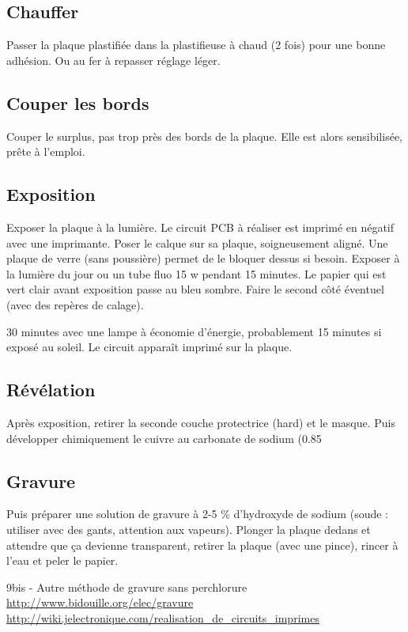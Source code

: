 \subsection{Chauffer}
Passer la plaque plastifiée dans la plastifieuse à chaud (2 fois) pour une bonne adhésion. Ou au fer à repasser réglage léger.

\subsection{Couper les bords}
Couper le surplus, pas trop près des bords de la plaque.
Elle est alors sensibilisée, prête à l'emploi.

\subsection{Exposition}
Exposer la plaque à la lumière.
Le circuit PCB à réaliser est imprimé en négatif avec une imprimante. Poser le calque sur sa plaque, soigneusement aligné. Une plaque de verre (sans poussière) permet de le bloquer dessus si besoin.
Exposer à la lumière du jour ou un tube fluo 15 w pendant 15 minutes. Le papier qui est vert clair avant exposition passe au bleu sombre.
Faire le second côté éventuel (avec des repères de calage).

30 minutes avec une lampe à économie d'énergie, probablement 15 minutes si exposé au soleil. Le circuit apparaît imprimé sur la plaque.

\subsection{Révélation}

Après exposition, retirer la seconde couche protectrice (hard) et le masque. Puis développer chimiquement le cuivre au carbonate de sodium (0.85 %

\subsection{Gravure}
Puis préparer une solution de gravure à 2-5 \% d'hydroxyde de sodium (soude : utiliser avec des gants, attention aux vapeurs).
Plonger la plaque dedans et attendre que ça devienne transparent, retirer la plaque (avec une pince), rincer à l'eau et peler le papier.

9bis - Autre méthode de gravure sans perchlorure
\url{http://www.bidouille.org/elec/gravure}
\url{http://wiki.jelectronique.com/realisation_de_circuits_imprimes}

